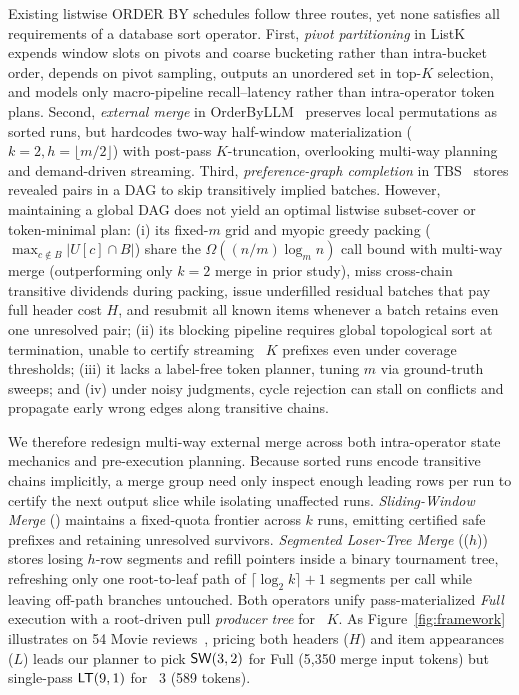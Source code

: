 Existing listwise \textsf{ORDER BY} schedules follow three routes, yet none satisfies all requirements of a database sort operator. First, \emph{pivot partitioning} in ListK~\cite{DBLP:journals/corr/abs-2603-17223} expends window slots on pivots and coarse bucketing rather than intra-bucket order, depends on pivot sampling, outputs an unordered set in top-$K$ selection, and models only macro-pipeline recall--latency rather than intra-operator token plans. Second, \emph{external merge} in OrderByLLM~\cite{DBLP:journals/corr/abs-2509-00303} preserves local permutations as sorted runs, but hardcodes two-way half-window materialization ($k{=}2, h{=}\lfloor m/2\rfloor$) with post-pass $K$-truncation, overlooking multi-way planning and demand-driven streaming. Third, \emph{preference-graph completion} in TBS~\cite{akinola2026tbs} stores revealed pairs in a DAG to skip transitively implied batches. However, maintaining a global DAG does not yield an optimal listwise subset-cover or token-minimal plan: (i) its fixed-$m$ grid and myopic greedy packing ($\max_{c\notin B}|U[c]\cap B|$) share the $\Omega((n/m)\log_m n)$ call bound with multi-way merge (outperforming only $k{=}2$ merge in prior study), miss cross-chain transitive dividends during packing, issue underfilled residual batches that pay full header cost $H$, and resubmit all known items whenever a batch retains even one unresolved pair; (ii) its blocking pipeline requires global topological sort at termination, unable to certify streaming \LIMIT~$K$ prefixes even under coverage thresholds; (iii) it lacks a label-free token planner, tuning $m$ via ground-truth sweeps; and (iv) under noisy judgments, cycle rejection can stall on conflicts and propagate early wrong edges along transitive chains.

We therefore redesign multi-way external merge across both intra-operator state mechanics and pre-execution planning. Because sorted runs encode transitive chains implicitly, a merge group need only inspect enough leading rows per run to certify the next output slice while isolating unaffected runs. \emph{Sliding-Window Merge} (\SW) maintains a fixed-quota frontier across $k$ runs, emitting certified safe prefixes and retaining unresolved survivors. \emph{Segmented Loser-Tree Merge} (\LT($h$)) stores losing $h$-row segments and refill pointers inside a binary tournament tree, refreshing only one root-to-leaf path of $\lceil\log_2 k\rceil + 1$ segments per call while leaving off-path branches untouched. Both operators unify pass-materialized \emph{Full} execution with a root-driven pull \emph{producer tree} for \LIMIT~$K$. As Figure~\ref{fig:framework} illustrates on 54 Movie \Qnine{} reviews~\cite{lao2026sembench}, pricing both headers ($H$) and item appearances ($L$) leads our planner to pick ${\mathsf{SW}}{}(3,2)$ for Full (5,350 merge input tokens) but single-pass ${\mathsf{LT}}{}(9,1)$ for \LIMIT~3 (589 tokens).


